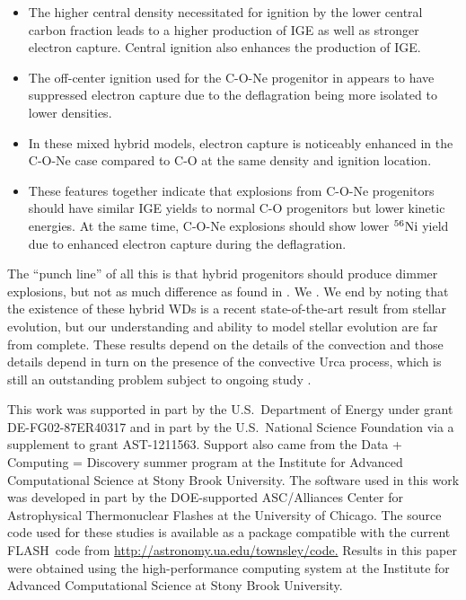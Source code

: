 \documentclass[iop,apj]{emulateapj}
\newcommand{\Ni}[1]{\ensuremath{{}^{#1}{\rm Ni}}}
\newcommand{\code}[1]{\textsc{#1}}
\newcommand{\FLASH}{\code{FLASH}}
\begin{document}
\begin{itemize}

\item
The higher central density necessitated for ignition by the lower central carbon fraction leads to a higher production of IGE as well as stronger electron capture.
Central ignition also enhances the production of IGE.

\item
The off-center ignition used for the C-O-Ne progenitor in \citet{willcoxetal2016} appears to have suppressed electron capture due to the deflagration being more isolated to lower densities.

\item
In these mixed hybrid models, electron capture is noticeably enhanced in the C-O-Ne case compared to C-O at the same density and ignition location.

\item
These features together indicate that explosions from C-O-Ne progenitors should have similar IGE yields to normal C-O progenitors but lower kinetic energies.
At the same time, C-O-Ne explosions should show lower \Ni{56} yield due to enhanced electron capture during the deflagration.

\end{itemize}

The ``punch line'' of all this is that hybrid progenitors should produce dimmer
explosions, but not as much difference as found in \citet{willcoxetal2016}. We
\citep{willcoxetal2016}. We end by noting that the existence of these hybrid
WDs is a recent state-of-the-art result from stellar evolution, but our understanding 
and ability to model stellar evolution are far from complete. These results depend
on the details of the convection and those details depend in turn on the
presence of the convective Urca process, which is still an outstanding problem 
subject to ongoing study \citep{calderetal2019,willcoxetal2019}.


This work was supported in part by the U.S.\ Department of Energy under
grant DE-FG02-87ER40317 and in part by the U.S.\ National Science Foundation
via a supplement to grant AST-1211563.
Support also came from the Data + Computing = Discovery summer program at
the Institute for Advanced Computational Science at Stony Brook University.
The software used in this work was developed in part by the DOE-supported
ASC/Alliances Center for Astrophysical Thermonuclear Flashes at the
University of Chicago.
The source code used for
these studies is available as a package compatible with the
current \FLASH\ code from \url{http://astronomy.ua.edu/townsley/code.}
Results in this
paper were obtained using the high-performance computing system at the
Institute for Advanced Computational Science at Stony Brook
University.




\end{document}
